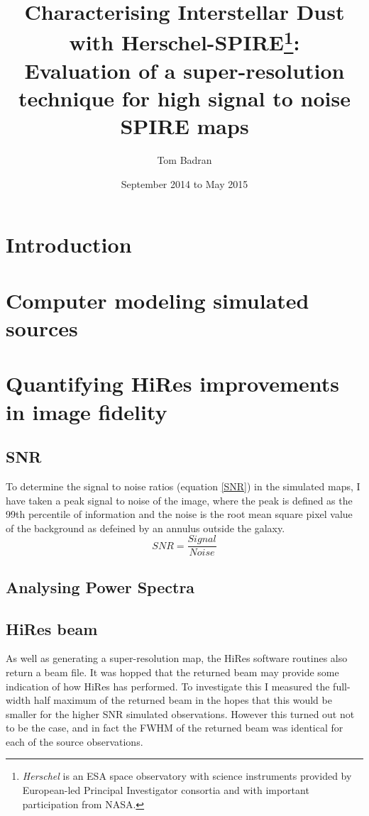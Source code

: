 \documentclass[a4paper]{article}
\title{Characterising Interstellar Dust with Herschel-SPIRE\thanks{{\it Herschel} is an ESA space observatory with science instruments provided by European-led Principal Investigator consortia and with important participation from NASA.}: \\ \large{Evaluation of a super-resolution technique for high signal to noise SPIRE maps}}
\author{Tom Badran}
\date{September 2014 to May 2015}
\numberwithin{equation}{section}
\begin{document}
\maketitle
\begin{abstract}

\end{abstract}

\tableofcontents

\listoffigures
\break
\begin{multicols}{2}
\raggedcolumns

\section{Introduction}




\section{Computer modeling simulated sources}


\section{Quantifying HiRes improvements in image fidelity}

\subsection{SNR}
To determine the signal to noise ratios (equation \ref{SNR}) in the simulated maps, I have taken a peak signal to noise of the image, where the peak is defined as the 99th percentile of information and the noise is the root mean square pixel value of the background as defeined by an annulus outside the galaxy.
\begin{equation}
    SNR = \frac{Signal}{Noise}
    \label{SNR}
\end{equation}

\subsection{Analysing Power Spectra}


\subsection{HiRes beam}

As well as generating a super-resolution map, the HiRes software routines also return a beam file. It was hopped that the returned beam may provide some indication of how HiRes has performed. To investigate this I measured the full-width half maximum of the returned beam in the hopes that this would be smaller for the higher SNR simulated observations. However this turned out not to be the case, and in fact the FWHM of the returned beam was identical for each of the source observations.


\end{multicols}
\end{document}
